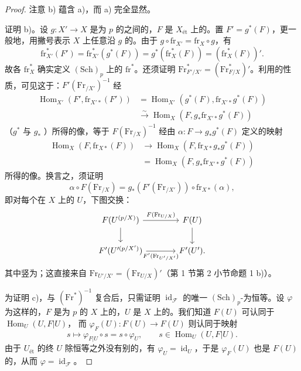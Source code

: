 \begin{proof}
注意 b) 蕴含 a)，而 a) 完全显然。

证明 b)。设 $g:X'\to X$ 是为 $p$ 的之间的，$F$ 是 $X_{\text{ét}}$ 上的。置 $F'=g^*(F)$，更一般地，用撇号表示 $X$ 上任意沿 $g$ 的。由于 $g\circ\mathrm{fr}_{X'}=\mathrm{fr}_X\circ g$，有
\[
\mathrm{fr}_{X'}^{*}(F')=\mathrm{fr}_{X'}^{*}(g^*(F))
=g^*(\mathrm{fr}_X^*(F))=(\mathrm{fr}_X^*(F))'.
\]
故各 $\mathrm{fr}_X^*$ 确实定义 $(\mathrm{Sch})_p$ 上的 $\mathrm{fr}^*$。还须证明 $\mathrm{Fr}_{F'/X'}^{*}=(\mathrm{Fr}_{F/X}^{*})'$。利用的性质，可见这于：$F'(\mathrm{Fr}_{/X'})^{-1}$ 经
\[
\begin{aligned}
\operatorname{Hom}_{X'}(F',\mathrm{fr}_{X'*}(F'))
&=\operatorname{Hom}_{X'}(g^*(F),\mathrm{fr}_{X'*}g^*(F))\\
&\xrightarrow{\sim}\operatorname{Hom}_X(F,g_*\mathrm{fr}_{X'*}g^*(F))
\end{aligned}
\]
（$g^*$ 与 $g_*$ ）所得的像，等于 $F(\mathrm{Fr}_{/X})^{-1}$ 经由 $\alpha:F\to g_*g^*(F)$ 定义的映射
\[
\begin{aligned}
\operatorname{Hom}_X(F,\mathrm{fr}_{X*}(F))
&\longrightarrow\operatorname{Hom}_X(F,\mathrm{fr}_{X*}g_*g^*(F))\\
&=\operatorname{Hom}_X(F,g_*\mathrm{fr}_{X'*}g^*(F))
\end{aligned}
\]
所得的像。换言之，须证明
\[
\alpha\circ F(\mathrm{Fr}_{/X})
=g_*(F'(\mathrm{Fr}_{/X'}))\circ\mathrm{fr}_{X*}(\alpha),
\]
即对每个在 $X$ 上的 $U$，下图交换：
\[
\begin{tikzcd}[column sep=large]
F(U^{(p/X)})\arrow[r,"F(\mathrm{Fr}_{U/X})"]\arrow[d]&F(U)\arrow[d]\\
F'(U'^{(p/X')})\arrow[r,"F'(\mathrm{Fr}_{U'/X'})"']&F'(U').
\end{tikzcd}
\]
其中竖为；这直接来自 $\mathrm{Fr}_{U'/X'}=(\mathrm{Fr}_{U/X})'$（第 1 节第 2 小节命题 1 b)）。

为证明 c)，与 $(\mathrm{Fr}^{*})^{-1}$ 复合后，只需证明 $\operatorname{id}_{\mathscr F}$ 的唯一 $(\mathrm{Sch})_p$-为恒等。设 $\varphi$ 为这样的，$F$ 是为 $p$ 的 $X$ 上的，$U$ 是 $X$ 上的。我们知道 $F(U)$ 可认同于 $\operatorname{Hom}_U(U,F|U)$，
而 $\varphi_F(U):F(U)\to F(U)$ 则认同于映射
\[
s\longmapsto\varphi_{F|U}\circ s=s\circ\varphi_U,
\qquad s\in\operatorname{Hom}_U(U,F|U).
\]
由于 $U_{\text{ét}}$ 的终 $U$ 除恒等之外没有别的，有 $\varphi_U=\operatorname{id}_U$，于是 $\varphi_F(U)$ 也是 $F(U)$ 的，从而 $\varphi=\operatorname{id}_{\mathscr F}$。
\end{proof}
